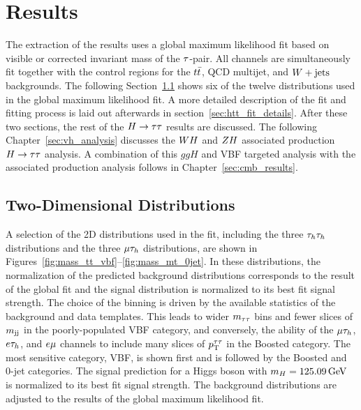 
\section{Results}
\label{sec:htt_results}

The extraction of the results uses a global maximum likelihood fit based on visible or 
corrected invariant mass of the $\tau$-pair. All 
channels are simultaneously fit together with the control regions for the $t\bar{t}$, QCD multijet, and $W +\text{jets}$ backgrounds. 
The following Section~\ref{sec:htt_2d} shows six of the twelve distributions used in the
global maximum likelihood fit. A more detailed description of the fit and fitting process is 
laid out afterwards in section~\ref{sec:htt_fit_details}. After these two sections,
the rest of the $H\to\tau\tau$ results are discussed.
The following Chapter~\ref{sec:vh_analysis} discusses the $WH$ and $ZH$ associated production $H\to\tau\tau$ analysis.
A combination of this $ggH$ and VBF targeted analysis with the associated production analysis
follows in Chapter~\ref{sec:cmb_results}.


\subsection{Two-Dimensional Distributions}
\label{sec:htt_2d}
A selection of the 2D distributions used in the fit, including the three $\tau_{h}\tau_{h}$ distributions and
the three $\mu\tau_{h}$ distributions, are shown in Figures~\ref{fig:mass_tt_vbf}--\ref{fig:mass_mt_0jet}.
In these distributions, the normalization of the predicted background distributions corresponds to the result of the global fit
and the signal distribution is normalized to its best fit signal strength.
The choice of the binning is driven by the available statistics of the background and data templates. This leads to wider 
$m_{\tau\tau}$ bins and fewer slices of $m_\mathrm{jj}$ in the poorly-populated VBF category, and conversely, the ability of the $\mu\tau_{h}$,
$e\tau_{h}$, and $e\mu$ channels to include many slices of $p_\mathrm{T}^{\tau\tau}$ in the Boosted category. 
The most sensitive category, VBF, is shown first and is followed by the Boosted and 0-jet categories.
The signal prediction for a Higgs boson with $m_{H} = 125.09\,\mathrm{GeV}$ is normalized to its best fit signal strength.
The background distributions are adjusted to the results of the global maximum likelihood fit.

